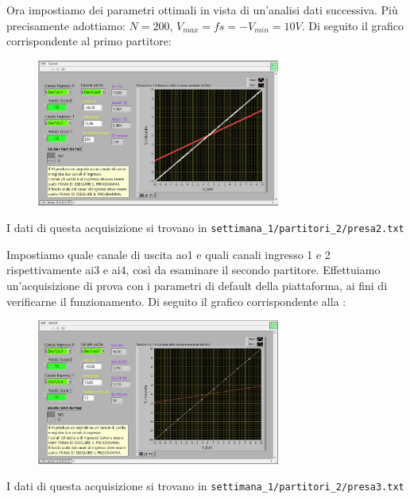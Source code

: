 Ora impostiamo dei parametri ottimali in vista di un'analisi dati successiva. Più precisamente adottiamo: $N = 200$, $V_{max} = fs = - V_{min} = 10 V$. Di seguito il grafico corrispondente al primo partitore:
\begin{figure}[H]
\caption{}
    \includegraphics[width=8cm]{settimana_1/immagini/traccia_2.jpg}
    \centering
\end{figure}
I dati di questa acquisizione si trovano in \verb+settimana_1/partitori_2/presa2.txt+

Impostiamo quale canale di uscita ao1 e quali canali ingresso 1 e 2 rispettivamente ai3 e ai4, così da esaminare il secondo partitore. Effettuiamo un'acquisizione di prova con i parametri di default della piattaforma, ai fini di verificarne il funzionamento.
Di seguito il grafico corrispondente alla :

\begin{figure}[H]
\caption{}
    \includegraphics[width=8cm]{settimana_1/immagini/traccia_3.jpg}
    \centering
\end{figure}
I dati di questa acquisizione si trovano in \verb+settimana_1/partitori_2/presa3.txt+

